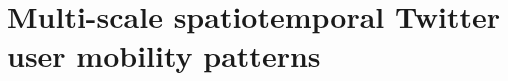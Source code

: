 \documentclass[a4paper, 11pt]{article}
\begin{document}
\section{Multi-scale spatiotemporal Twitter user mobility patterns}
\end{document}
